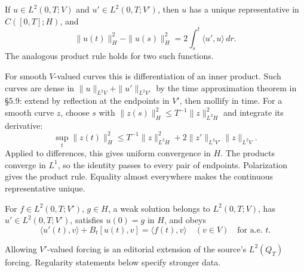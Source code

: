 \Needspace{55mm}
\begin{lemma}
\label{lem:7-trace}
If $u\in L^2(0,T;V)$ and $u'\in L^2(0,T;V')$, then $u$ has a unique
representative in $C([0,T];H)$, and
\begin{equation}\label{eq:7-chain}
 \|u(t)\|_H^2-\|u(s)\|_H^2
 =2\int_s^t\langle u',u\rangle\,dr.
\end{equation}
The analogous product rule holds for two such functions.
\end{lemma}
\begin{expandedproof}
For smooth $V$-valued curves this is differentiation of an inner product.
Such curves are dense in $\|u\|_{L^2V}+\|u'\|_{L^2V'}$ by the time
approximation theorem in \S5.9: extend by reflection at the
endpoints in $V'$, then mollify in time. For a smooth curve $z$, choose $s$
with $\|z(s)\|_H^2\leq T^{-1}\|z\|_{L^2H}^2$ and integrate its derivative:
\[
 \sup_t\|z(t)\|_H^2\leq T^{-1}\|z\|_{L^2H}^2
       +2\|z'\|_{L^2V'}\|z\|_{L^2V}.
\]
Applied to differences, this gives uniform convergence in $H$.
The products converge in $L^1$, so the identity passes to every pair of
endpoints. Polarization gives the product rule. Equality almost everywhere
makes the continuous representative unique.
\end{expandedproof}
\begin{definition}
For $f\in L^2(0,T;V')$, $g\in H$, a weak solution belongs to $L^2(0,T;V)$,
has $u'\in L^2(0,T;V')$, satisfies $u(0)=g$ in $H$, and obeys
\[
 \langle u'(t),v\rangle+B_t[u(t),v]=\langle f(t),v\rangle
 \quad(v\in V)\quad\text{for a.e. }t.
\]
\end{definition}
Allowing $V'$-valued forcing is an editorial extension of the source's
$L^2(Q_T)$ forcing. Regularity statements below specify stronger data.
\Needspace{55mm}

\Needspace{55mm}
